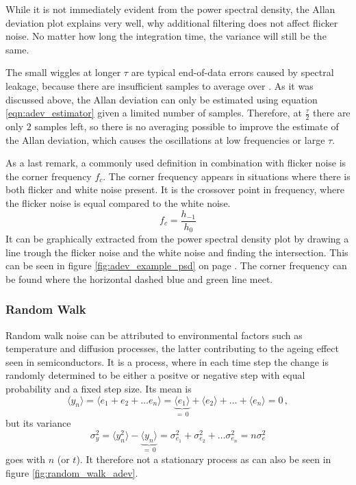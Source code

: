 While it is not immediately evident from the power spectral density, the Allan deviation plot explains very well, why additional filtering does not affect flicker noise. No matter how long the integration time, the variance will still be the same.

The small wiggles at longer $\tau$ are typical end-of-data errors caused by spectral leakage, because there are insufficient samples to average over \cite{adev_long_tau}. As it was discussed above, the Allan deviation can only be estimated using equation \ref{eqn:adev_estimator} given a limited number of samples. Therefore, at $\frac{\tau}{2}$ there are only $2$ samples left, so there is no averaging possible to improve the estimate of the Allan deviation, which causes the oscillations at low frequencies or large $\tau$.

As a last remark, a commonly used definition in combination with flicker noise is the corner frequency $f_c$. The corner frequency appears in situations where there is both flicker and white noise present. It is the crossover point in frequency, where the flicker noise is equal compared to the white noise.
\begin{equation}
    f_c = \frac{h_{-1}}{h_0} \label{eqn:corner_frequency}
\end{equation}
It can be graphically extracted from the power spectral density plot by drawing a line trough the flicker noise and the white noise and finding the intersection. This can be seen in figure \ref{fig:adev_example_psd} on page \pageref{fig:adev_example_psd}. The corner frequency can be found where the horizontal dashed blue and green line meet.

\subsubsection{Random Walk}%
\label{sec:random_walk}
Random walk noise can be attributed to environmental factors such as temperature \cite{random_walk_fm} and diffusion processes, the latter contributing to the ageing effect seen in semiconductors.
It is a process, where in each time step the change is randomly determined to be either a positve or negative step with equal probability and a fixed step size. Its mean is
\begin{equation}
    \langle y_n \rangle = \langle e_1 + e_2 + \dots e_n \rangle = \underbrace{\langle e_1 \rangle}_{=\,0} + \langle e_2 \rangle + \dots + \langle e_n \rangle = 0 \, ,
\end{equation}
but its variance
\begin{equation}
    \sigma_y^2 = \langle y_n^2 \rangle - \underbrace{\langle y_n \rangle}_{=\,0} = \sigma_{e_1}^2 + \sigma_{e_2}^2 + \dots \sigma_{e_n}^2 = n \sigma_e^2
\end{equation}
goes with $n$ (or $t$). It therefore not a stationary process as can also be seen in figure \ref{fig:random_walk_adev}.

